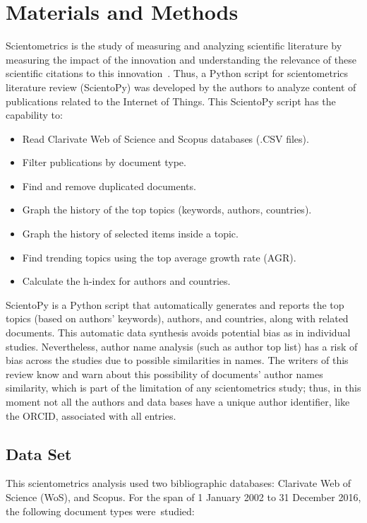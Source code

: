 \documentclass[symmetry,article,accept,moreauthors,pdftex10pt,a4paper]{mdpi}
\begin{document}
\section{Materials and Methods}

Scientometrics is the study of measuring and analyzing scientific literature by measuring the impact of the innovation and understanding the relevance of these scientific citations to this innovation~\cite{DBLP:journals/corr/abs-1208-4566}. Thus, a Python script for scientometrics literature review (ScientoPy) was developed by the authors to analyze content of publications related to the Internet of Things. This ScientoPy script has the capability to: 

\begin{itemize}
	\item Read Clarivate Web of Science and Scopus databases (.CSV files).
	\item Filter publications by document type.
	\item Find and remove duplicated documents.
	\item Graph the history of the top topics (keywords, authors, countries).
	\item Graph the history of selected items inside a topic.
	\item Find trending topics using the top average growth rate (AGR). 
    \item Calculate the h-index for authors and countries. 
\end{itemize}

ScientoPy is a Python script that automatically generates and reports the top topics (based on authors' keywords), authors, and countries, along with related documents. This automatic data synthesis avoids potential bias as in individual studies. Nevertheless, author name analysis (such as author top list) has a risk of bias across the studies due to possible similarities in names. The writers of this review know and warn about this possibility of documents' author names similarity, which is part of the limitation of any scientometrics study; thus, in this moment not all the authors and data bases have a unique author identifier, like the ORCID, associated with all entries.

\subsection{Data Set}

This scientometrics analysis used two bibliographic databases: Clarivate Web of Science (WoS), and Scopus. For the span of 1 January 2002 to 31 December 2016, the following document types were~studied:
\end{document}
